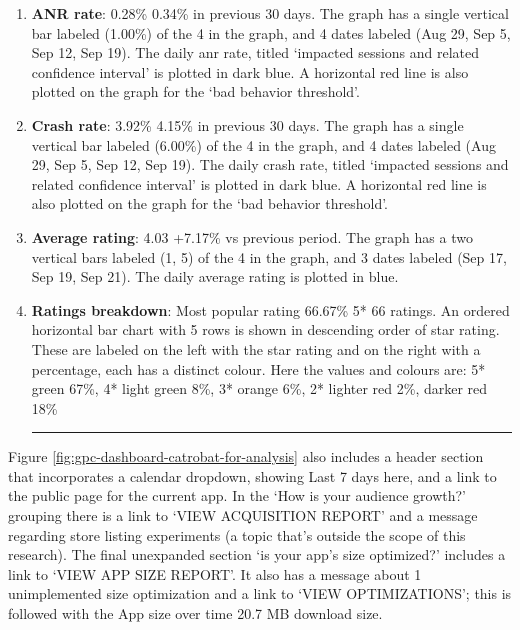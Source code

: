 \begin{enumerate}
    \vspace{0.2cm}
    \hrule
    \vspace{0.3cm}
    
    \item \textbf{ANR rate}: 0.28\% 0.34\% in previous 30 days. The graph has a single vertical bar labeled (1.00\%) of the 4 in the graph, and 4 dates labeled (Aug 29, Sep 5, Sep 12, Sep 19). The daily \gls{anr} rate, titled `impacted sessions and related confidence interval' is plotted in dark blue. A horizontal red line is also plotted on the graph for the `bad behavior threshold'.
    \item \textbf{Crash rate}: 3.92\% 4.15\% in previous 30 days. The graph has a single vertical bar labeled (6.00\%) of the 4 in the graph, and 4 dates labeled (Aug 29, Sep 5, Sep 12, Sep 19). The daily crash rate, titled `impacted sessions and related confidence interval' is plotted in dark blue. A horizontal red line is also plotted on the graph for the `bad behavior threshold'.

    \item \textbf{Average rating}: 4.03 +7.17\% vs previous period. The graph has a two vertical bars labeled (1, 5) of the 4 in the graph, and 3 dates labeled (Sep 17, Sep 19, Sep 21). The daily average rating is plotted in blue.
    \item \textbf{Ratings breakdown}: Most popular rating 66.67\% 5* 66 ratings. An ordered horizontal bar chart with 5 rows is shown in descending order of star rating. These are labeled on the left with the star rating and on the right with a percentage, each has a distinct colour. Here the values and colours are: 5* green 67\%, 4* light green 8\%, 3* orange 6\%, 2* lighter red 2\%, darker red 18\%
    
    \vspace{0.2cm}
    \hrule
    \vspace{0.3cm}
    
\end{enumerate}

Figure \ref{fig:gpc-dashboard-catrobat-for-analysis} also includes a header section that incorporates a calendar dropdown, showing Last 7 days here, and a link to the public page for the current app. In the `How is your audience growth?' grouping there is a link to `VIEW ACQUISITION REPORT' and a message regarding store listing experiments (a topic that's outside the scope of this research). The final unexpanded section `is your app's size optimized?' includes a link to `VIEW APP SIZE REPORT'. It also has a message about 1 unimplemented size optimization and a link to `VIEW OPTIMIZATIONS'; this is followed with the App size over time 20.7 MB download size.

